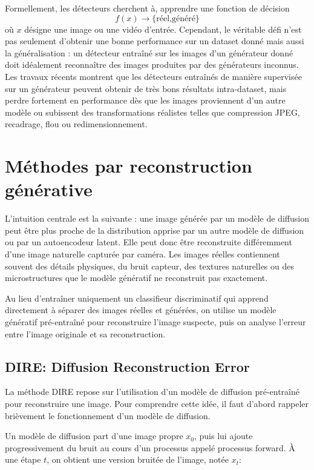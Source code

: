\documentclass[runningheads]{llncs}
\begin{document}
Formellement, les détecteurs cherchent à, apprendre une fonction de décision
$$
    f(x)\to \{\text{réel,généré}\}
$$
où $x$ désigne une image ou une vidéo d’entrée. Cependant, le véritable défi n’est pas seulement d’obtenir une bonne performance sur un dataset donné mais aussi la généralisation : un détecteur entraîné sur les images d’un générateur donné doit idéalement reconnaître des images produites par des générateurs inconnus. Les travaux récents montrent que les détecteurs entraînés de manière supervisée sur un générateur peuvent obtenir de très bons résultats intra-dataset, mais perdre fortement en performance dès que les images proviennent d’un autre modèle ou subissent des transformations réalistes telles que compression JPEG, recadrage, flou ou redimensionnement\citep{ojha2024universalfakeimagedetectors}.


\section{Méthodes par reconstruction générative}

L’intuition centrale est la suivante : une image générée par un modèle de diffusion peut être plus proche de la distribution apprise par un autre modèle de diffusion ou par un autoencodeur latent. Elle peut donc être reconstruite différemment d’une image naturelle capturée par caméra. Les images réelles contiennent souvent des détails physiques, du bruit capteur, des textures naturelles ou des microstructures que le modèle génératif ne reconstruit pas exactement.


Au lieu d’entraîner uniquement un classifieur discriminatif qui apprend directement à séparer des images réelles et générées, on utilise un modèle génératif pré-entraîné pour reconstruire l’image suspecte, puis on analyse l’erreur entre l’image originale et sa reconstruction.

 

 \subsection{DIRE: Diffusion Reconstruction Error}
 La méthode DIRE \citep{wang2023dirediffusiongeneratedimagedetection} repose sur l’utilisation d’un modèle de diffusion pré-entraîné pour reconstruire une image. Pour comprendre cette idée, il faut d’abord rappeler brièvement le fonctionnement d’un modèle de diffusion.

Un modèle de diffusion part d’une image propre $x_0$, puis lui ajoute progressivement du bruit au cours d’un processus appelé processus forward. À une étape $t$, on obtient une version bruitée de l’image, notée $x_t$:
 
\end{document}
